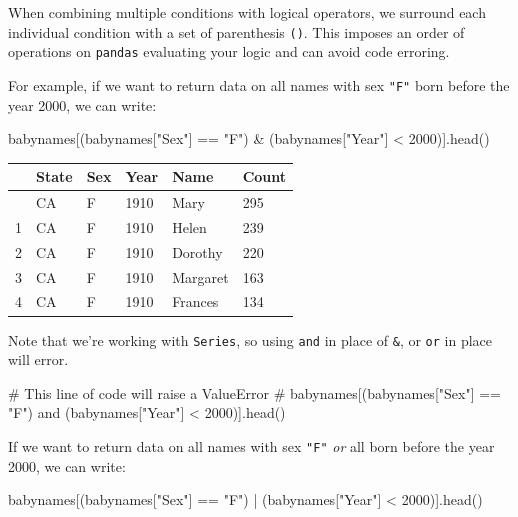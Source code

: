 \documentclass[
  letterpaper,
  DIV=11,
  numbers=noendperiod]{scrreprt}
\newenvironment{Shaded}{\begin{snugshade}}{\end{snugshade}}
\newcommand{\CommentTok}[1]{\textcolor[rgb]{0.37,0.37,0.37}{#1}}
\newcommand{\DecValTok}[1]{\textcolor[rgb]{0.68,0.00,0.00}{#1}}
\newcommand{\NormalTok}[1]{\textcolor[rgb]{0.00,0.23,0.31}{#1}}
\newcommand{\OperatorTok}[1]{\textcolor[rgb]{0.37,0.37,0.37}{#1}}
\newcommand{\StringTok}[1]{\textcolor[rgb]{0.13,0.47,0.30}{#1}}
\begin{document}
When combining multiple conditions with logical operators, we surround
each individual condition with a set of parenthesis \texttt{()}. This
imposes an order of operations on \texttt{pandas} evaluating your logic
and can avoid code erroring.

For example, if we want to return data on all names with sex
\texttt{"F"} born before the year 2000, we can write:

\begin{Shaded}
\begin{Highlighting}[]
\NormalTok{babynames[(babynames[}\StringTok{"Sex"}\NormalTok{] }\OperatorTok{==} \StringTok{"F"}\NormalTok{) }\OperatorTok{\&}\NormalTok{ (babynames[}\StringTok{"Year"}\NormalTok{] }\OperatorTok{\textless{}} \DecValTok{2000}\NormalTok{)].head()}
\end{Highlighting}
\end{Shaded}

\begin{longtable}[]{@{}llllll@{}}
\toprule\noalign{}
& State & Sex & Year & Name & Count \\
\midrule\noalign{}
\endhead
\bottomrule\noalign{}
\endlastfoot
0 & CA & F & 1910 & Mary & 295 \\
1 & CA & F & 1910 & Helen & 239 \\
2 & CA & F & 1910 & Dorothy & 220 \\
3 & CA & F & 1910 & Margaret & 163 \\
4 & CA & F & 1910 & Frances & 134 \\
\end{longtable}

Note that we're working with \texttt{Series}, so using \texttt{and} in
place of \texttt{\&}, or \texttt{or} in place \texttt{\textbar{}} will
error.

\begin{Shaded}
\begin{Highlighting}[]
\CommentTok{\# This line of code will raise a ValueError}
\CommentTok{\# babynames[(babynames["Sex"] == "F") and (babynames["Year"] \textless{} 2000)].head()}
\end{Highlighting}
\end{Shaded}

If we want to return data on all names with sex \texttt{"F"} \emph{or}
all born before the year 2000, we can write:

\begin{Shaded}
\begin{Highlighting}[]
\NormalTok{babynames[(babynames[}\StringTok{"Sex"}\NormalTok{] }\OperatorTok{==} \StringTok{"F"}\NormalTok{) }\OperatorTok{|}\NormalTok{ (babynames[}\StringTok{"Year"}\NormalTok{] }\OperatorTok{\textless{}} \DecValTok{2000}\NormalTok{)].head()}
\end{Highlighting}
\end{Shaded}
\end{document}
